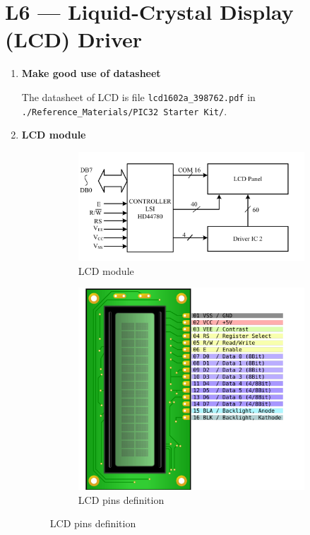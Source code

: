 \documentclass[a4paper]{article}
\begin{document}
\section*{L6 --- Liquid-Crystal Display (LCD) Driver}
  \begin{enumerate}[label = \arabic*.]
    \item \textbf{Make good use of datasheet}
      \par The datasheet of LCD is file \verb|lcd1602a_398762.pdf| in \verb|./Reference_Materials/PIC32 Starter Kit/|.

    \item \textbf{LCD module}
      \begin{figure}[H]
        \centering
        \begin{subfigure}[b]{0.6\linewidth}
          \centering
          \includegraphics[width=0.9\linewidth]{LCD_module.jpeg}
          \caption{LCD module}
          \label{subfig:LCD_module.jpeg}
        \end{subfigure}
        \begin{subfigure}[b]{0.3\linewidth}
          \centering
          \includegraphics[width=0.9\linewidth]{LCD_pins_definition.jpeg}
          \caption{LCD pins definition}
          \label{subfig:LCD_pins_definition.jpeg}
        \end{subfigure}
        \label{fig:LCD_module}
      \end{figure}


\end{enumerate}
\end{document}
